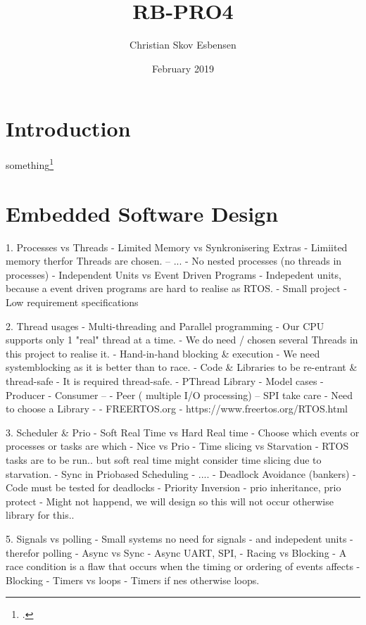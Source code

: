 \documentclass[11pt]{article}
\title{RB-PRO4}
\author{Christian Skov Esbensen}
\date{February 2019}
\begin{document}

\maketitle

\tableofcontents 
\newpage
{}

\section{Introduction}
something\footcite[]{book}


\section{Embedded Software Design}
1. Processes vs Threads
- Limited Memory vs Synkronisering Extras
    - Limiited memory therfor Threads are chosen. -- ...
    - No nested processes (no threads in processes)
- Independent Units vs Event Driven Programs
    - Indepedent units, because a event driven programs are hard to realise as RTOS.
    - Small project
    - Low requirement specifications

2. Thread usages
- Multi-threading and Parallel programming
    - Our CPU supports only 1 "real" thread at a time.
    - We do need / chosen several Threads in this project to realise it.
- Hand-in-hand blocking \& execution
    - We need systemblocking as it is better than to race.
- Code \& Libraries to be re-entrant \& thread-safe
    - It is required thread-safe. 
- PThread Library
  - Model cases
    - Producer - Consumer --
    - Peer ( multiple I/O processing) -- SPI take care
    - Need to choose a Library - 
    - FREERTOS.org - https://www.freertos.org/RTOS.html

3. Scheduler \& Prio
- Soft Real Time vs Hard Real time
    - Choose which events or processes or tasks are which
    - Nice vs Prio
- Time slicing vs Starvation
    - RTOS tasks are to be run.. but soft real time might consider time slicing due to starvation. 
- Sync in Priobased Scheduling
    - ....
- Deadlock Avoidance (bankers)
    - Code must be tested for deadlocks
- Priority Inversion - prio inheritance, prio protect
    - Might not happend, we will design so this will not occur otherwise library for this..

5. Signals vs polling
    - Small systems no need for signals - and indepedent units - therefor polling
- Async vs Sync
    - Async UART, SPI, 
- Racing vs Blocking - A race condition is a flaw that occurs when the timing or ordering of events affects
    - Blocking
- Timers vs loops
    - Timers if nes otherwise loops.
\end{document}
